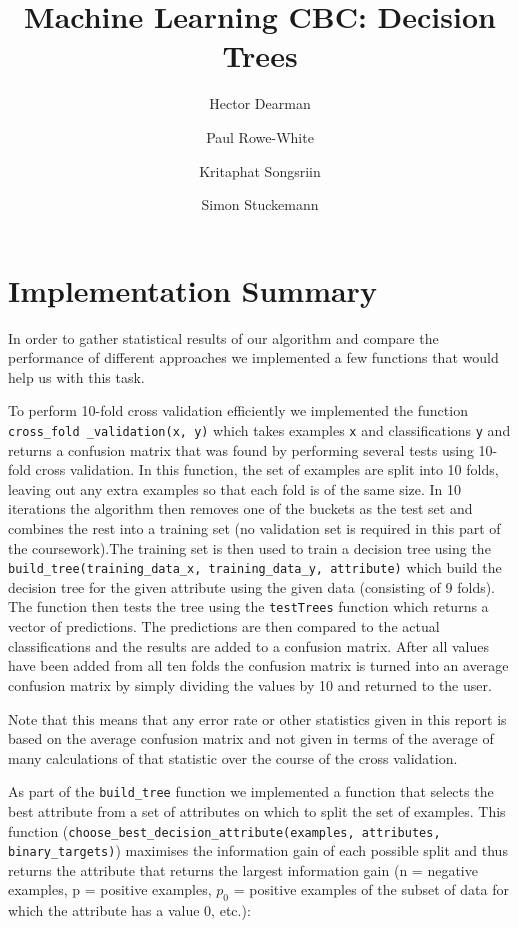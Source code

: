 \documentclass[11pt,a4paper]{article}
\author{Hector Dearman \and Paul Rowe-White \and Kritaphat Songsriin \and Simon Stuckemann}
\title{Machine Learning CBC: Decision Trees}
\begin{document}
\maketitle

\section{Implementation Summary}

In order to gather statistical results of our algorithm and compare the performance of different approaches we implemented a few functions that would help us with this task.

To perform 10-fold cross validation efficiently we implemented the function \texttt{cross\_fold \_validation(x, y)} which takes examples \texttt{x} and classifications \texttt{y} and returns a confusion matrix that was found by performing several tests using 10-fold cross validation. In this function, the set of examples are split into 10 folds, leaving out any extra examples so that each fold is of the same size. In 10 iterations the algorithm then removes one of the buckets as the test set and combines the rest into a training set (no validation set is required in this part of the coursework).The training set is then used to train a decision tree using the \texttt{build\_tree(training\_data\_x, training\_data\_y, attribute)} which build the decision tree for the given attribute using the given data (consisting of 9 folds). The function then tests the tree using the \texttt{testTrees} function which returns a vector of predictions. The predictions are then compared to the actual classifications and the results are added to a confusion matrix. After all values have been added from all ten folds the confusion matrix is turned into an average confusion matrix by simply dividing the values by 10 and returned to the user. 

Note that this means that any error rate or other statistics given in this report is based on the average confusion matrix and not given in terms of the average of many calculations of that statistic over the course of the cross validation. 

As part of the \texttt{build\_tree} function we implemented a function that selects the best attribute from a set of attributes on which to split the set of examples. This function (\texttt{choose\-\_best\-\_decision\-\_attribute(examples, attributes, binary\_targets)}) maximises the information gain of each possible split and thus returns the attribute that returns the largest information gain (n = negative examples, p = positive examples, $p_0$ = positive examples of the subset of data for which the attribute has a value 0, etc.):
\end{document}
